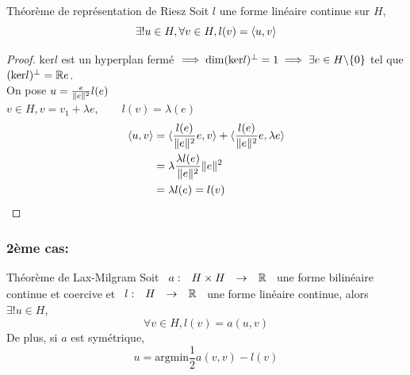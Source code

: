 \documentclass[]{report}
\begin{document}
    \begin{tm}{Théorème de représentation de Riesz}{}
        Soit $l$ une forme linéaire continue sur $H$,
        \[\exists! u\in H,\forall v\in H,l(v)=\langle u,v \rangle\]
    \end{tm}

    \begin{proof}
        $\text{ker} l$ est un hyperplan fermé $\implies \dim (\text{ker} l)^{\perp}=1\implies \exists e\in H\backslash \{0\}$ tel que $(\text{ker}l)^{\perp}=\mathbb{R} e$.\\
        On pose $u=\frac{e}{\lVert e \rVert^2}l(e)$\\
        $v\in H,v=v_1+\lambda e,\qquad l(v)=\lambda(e)$
        \begin{align*}
            \langle u,v \rangle&=\langle \frac{l(e)}{\lVert e \rVert^2}e,v \rangle+\langle \frac{l(e)}{\lVert e \rVert^2}e,\lambda e \rangle\\
            &=\lambda \frac{\lambda l(e)}{\lVert e \rVert^2}\lVert e \rVert^2\\
            &=\lambda l(e)=l(v)
        \end{align*}
    \end{proof}

    \subsubsection*{2ème cas:}

    \begin{tm}{Théorème de Lax-Milgram}{}
        Soit $\begin{array}{ccccc} a : & H\times H & \to & \mathbb{R} \end{array}$ une forme bilinéaire continue et coercive et $\begin{array}{ccccc} l : & H & \to & \mathbb{R} \end{array}$ une forme linéaire continue, alors $\exists! u\in H$,
        \[\forall v\in H, l(v)=a(u,v)\]
        De plus, si $a$ est symétrique,
        \[u=\text{argmin}\frac{1}{2} a(v,v)-l(v)\]
    \end{tm}
\end{document}
